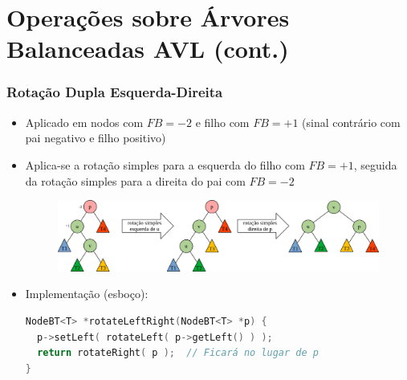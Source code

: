 \documentclass[aspectratio=169]{beamer}
\begin{document}
\begin{frame}[fragile]
\begin{enumerate}
\begin{tabular}{lll}
\end{tabular}
\end{enumerate}
\end{frame}

\section{Operações sobre Árvores Balanceadas AVL (cont.)}

\begin{frame}[fragile]\frametitle{Rotação Dupla Esquerda-Direita}
\begin{itemize}
	\item Aplicado em nodos com $FB = -2$ e filho com $FB = +1$ (sinal contrário com pai negativo e filho positivo)
	\item Aplica-se a rotação simples para a esquerda do filho com $FB = +1$, seguida da rotação simples para a direita do pai com $FB = -2$
\begin{figure}[h]
	\centering
	\includegraphics[height=0.3\paperheight]{imagens/rot_dup_esq_dir0.png}
\end{figure}
	\item Implementação (esboço):
\begin{lstlisting}[language=C++,basicstyle=\ttfamily\scriptsize]
NodeBT<T> *rotateLeftRight(NodeBT<T> *p) {
  p->setLeft( rotateLeft( p->getLeft() ) );
  return rotateRight( p );  // Ficará no lugar de p
}
\end{lstlisting}
\end{itemize}
\end{frame}
\end{document}
